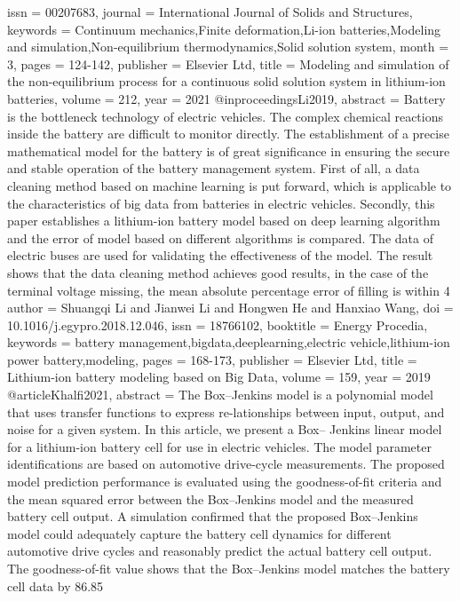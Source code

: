 {{{{{   issn = {00207683},
   journal = {International Journal of Solids and Structures},
   keywords = {Continuum mechanics,Finite deformation,Li-ion batteries,Modeling and simulation,Non-equilibrium thermodynamics,Solid solution system},
   month = {3},
   pages = {124-142},
   publisher = {Elsevier Ltd},
   title = {Modeling and simulation of the non-equilibrium process for a continuous solid solution system in lithium-ion batteries},
   volume = {212},
   year = {2021}
}
@inproceedings{Li2019,
   abstract = {Battery is the bottleneck technology of electric vehicles. The complex chemical reactions inside the battery are difficult to monitor directly. The establishment of a precise mathematical model for the battery is of great significance in ensuring the secure and stable operation of the battery management system. First of all, a data cleaning method based on machine learning is put forward, which is applicable to the characteristics of big data from batteries in electric vehicles. Secondly, this paper establishes a lithium-ion battery model based on deep learning algorithm and the error of model based on different algorithms is compared. The data of electric buses are used for validating the effectiveness of the model. The result shows that the data cleaning method achieves good results, in the case of the terminal voltage missing, the mean absolute percentage error of filling is within 4%
   author = {Shuangqi Li and Jianwei Li and Hongwen He and Hanxiao Wang},
   doi = {10.1016/j.egypro.2018.12.046},
   issn = {18766102},
   booktitle = {Energy Procedia},
   keywords = {battery management,bigdata,deeplearning,electric vehicle,lithium-ion power battery,modeling},
   pages = {168-173},
   publisher = {Elsevier Ltd},
   title = {Lithium-ion battery modeling based on Big Data},
   volume = {159},
   year = {2019}
}
@article{Khalfi2021,
   abstract = {The Box–Jenkins model is a polynomial model that uses transfer functions to express re-lationships between input, output, and noise for a given system. In this article, we present a Box– Jenkins linear model for a lithium-ion battery cell for use in electric vehicles. The model parameter identifications are based on automotive drive-cycle measurements. The proposed model prediction performance is evaluated using the goodness-of-fit criteria and the mean squared error between the Box–Jenkins model and the measured battery cell output. A simulation confirmed that the proposed Box–Jenkins model could adequately capture the battery cell dynamics for different automotive drive cycles and reasonably predict the actual battery cell output. The goodness-of-fit value shows that the Box–Jenkins model matches the battery cell data by 86.85%
}}}}}}}
